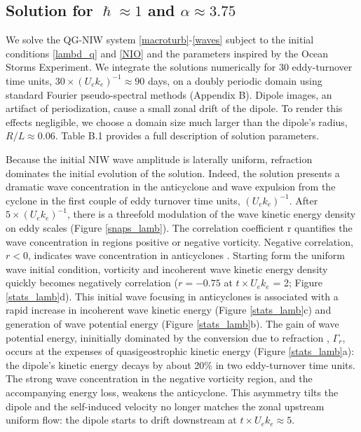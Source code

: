 \documentclass{jfm}
\begin{document}
\subsection{Solution for $\hslash \approx 1$ and $\alpha \approx 3.75$}
We solve the QG-NIW system \eqref{macroturb}-\eqref{waves} subject to the
initial conditions \eqref{lambd_q} and \eqref{NIO} and the parameters inspired
by the Ocean Storms Experiment. We integrate the solutions numerically
 for $30$ eddy-turnover time units,
$30\times (U_e k_e)^{-1}\approx 90$ days, on a
doubly periodic domain using standard Fourier pseudo-spectral methods (Appendix B).
Dipole images, an artifact of periodization,
cause a small zonal drift of the dipole. To render this effects negligible, we
choose a domain size much larger than the dipole's radius, $R/L \approx 0.06$.
Table B.1 provides a full description of solution parameters.


Because the initial NIW wave amplitude is laterally uniform, refraction dominates
the initial evolution of the solution.
Indeed, the solution presents a dramatic wave concentration
in the anticyclone and wave expulsion from the cyclone in the first couple of
eddy turnover time units, $(U_e k_e)^{-1}$. After $5 \times (U_e k_e)^{-1}$, there
is a threefold modulation of the wave kinetic energy density on eddy scales
(Figure \ref{snaps_lamb}). The  correlation coefficient
\beq
\label{corr_r}
r  {}\com
\eeq
quantifies the wave concentration in regions positive or negative vorticity.
Negative correlation, $r<0$, indicates wave concentration in anticyclones
\citep{danioux_etal2015}. Starting form the uniform wave initial condition,
vorticity and incoherent wave kinetic energy density
quickly becomes negatively correlation ($r=-0.75$ at $t\times U_e k_e$ = 2;
Figure \ref{stats_lamb}d). This initial wave focusing in anticyclones is associated
with a rapid increase in incoherent wave kinetic energy (Figure \ref{stats_lamb}c)
and generation of wave potential energy (Figure \ref{stats_lamb}b). The gain of
wave potential energy, ininitially dominated by the conversion due to refraction
, $\Gamma_r$,
 occurs at the expenses of quasigeostrophic kinetic energy
(Figure \ref{stats_lamb}a):
the dipole's kinetic energy decays by about 20$\%$ in two eddy-turnover time units.
The strong wave concentration in the negative vorticity region, and the accompanying
energy loss, weakens the anticyclone.  This asymmetry tilts the dipole and
the self-induced velocity no longer matches the zonal upstream uniform flow:
the dipole starts to drift downstream at $t\times U_e k_e \approx 5$.
\end{document}
